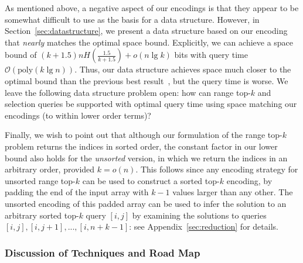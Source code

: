 \documentclass[runningheads]{llncs}
\newcommand{\Oh}{\mathcal{O}}
\begin{document}
As mentioned above, a negative aspect of our encodings is that they
appear to be somewhat difficult to use as the basis for a data
structure.  However, in Section~\ref{sec:datastructure}, we present a
data structure based on our encoding that \emph{nearly} matches the
optimal space bound.  Explicitly, we can achieve a space bound of
$(k+1.5)nH(\frac{1.5}{k+1.5}) + o(n\lg k)$ bits with query time
$\Oh(\text{poly}(k\lg n))$.  Thus, our data structure achieves space
much closer to the optimal bound than the previous best
result~\cite{NRS14}, but the query time is worse.  We leave the
following data structure problem open: how can range top-$k$ and
selection queries be supported with optimal query time using space
matching our encodings (to within lower order terms)?

Finally, we wish to point out that although our formulation of the
range top-$k$ problem returns the indices in sorted order, the
constant factor in our lower bound also holds for the \emph{unsorted}
version, in which we return the indices in an arbitrary order,
provided $k=o(n)$.  This follows since any encoding strategy for
unsorted range top-$k$ can be used to construct a sorted top-$k$
encoding, by padding the end of the input array with $k-1$ values
larger than any other.  The unsorted encoding of this padded array can
be used to infer the solution to an arbitrary sorted top-$k$ query
$[i,j]$ by examining the solutions to queries $[i,j], [i,j+1], ...,
[i,n+k-1]$: see Appendix~\ref{sec:reduction} for details.





\subsubsection{Discussion of Techniques and Road Map} 
\end{document}
